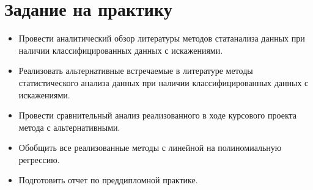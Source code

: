 \section{Задание на практику}
\begin{itemize}
    \item Провести аналитический обзор литературы методов статанализа данных при наличии классифицированных данных с искажениями.
    \item Реализовать альтернативные встречаемые в литературе методы статистического анализа данных при наличии классифицированных данных с искажениями.
    \item Провести сравнительный анализ реализованного в ходе курсового проекта метода с альтернативными.
    \item Обобщить все реализованные методы с линейной на полиномиальную регрессию.
    \item Подготовить отчет по преддипломной практике.
\end{itemize}